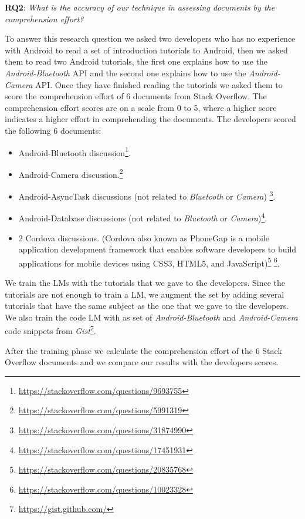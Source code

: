 \documentclass[12pt,mscthesis]{usiinfthesis}
\begin{document}
		{\textbf{RQ2}: \emph{What is the accuracy of our technique in assessing documents by the comprehension effort?}


		To answer this research question we asked two developers who has no experience with Android to read a set of introduction tutorials to Android, then we asked them to read two Android tutorials, the first one explains how to use the \emph{Android-Bluetooth} API and the second one explains how to use the \emph{Android-Camera} API. Once they have finished reading the tutorials we asked them to score the comprehension effort of 6 documents from Stack Overflow. The comprehension effort scores are on a scale from 0 to 5, where a higher score indicates a higher effort in comprehending the documents. The developers scored the following 6 documents:

		\begin{itemize}
			\item   Android-Bluetooth discussion\footnote{\url{https://stackoverflow.com/questions/9693755}}.
			\item   Android-Camera discussion.\footnote{\url{https://stackoverflow.com/questions/5991319}}
			\item   Android-AsyncTask discussions (not related to \emph{Bluetooth} or \emph{Camera}) \footnote{\url{https://stackoverflow.com/questions/31874990}}.
			\item   Android-Database discussions (not related to \emph{Bluetooth} or \emph{Camera})\footnote{\url{https://stackoverflow.com/questions/17451931}}.
			\item   2 Cordova discussions. (Cordova also known as PhoneGap is a mobile application development framework that enables software developers to build applications for mobile devices using CSS3, HTML5, and JavaScript)\footnote{\url{https://stackoverflow.com/questions/20835768}} \footnote{\url{https://stackoverflow.com/questions/10023328}}.
		\end{itemize}

		We train the LMs with the tutorials that we gave to the developers. Since the tutorials are not enough to train a LM, we augment the set by adding several tutorials that have the same subject as the one that we gave to the developers. We also train the code LM with as set of \emph{Android-Bluetooth} and \emph{Android-Camera} code snippets from \emph{Gist}\footnote{\url{https://gist.github.com/}}.


		 After the training phase we calculate the comprehension effort of the 6 Stack Overflow documents and we compare our results with the developers scores.



}
\end{document}
